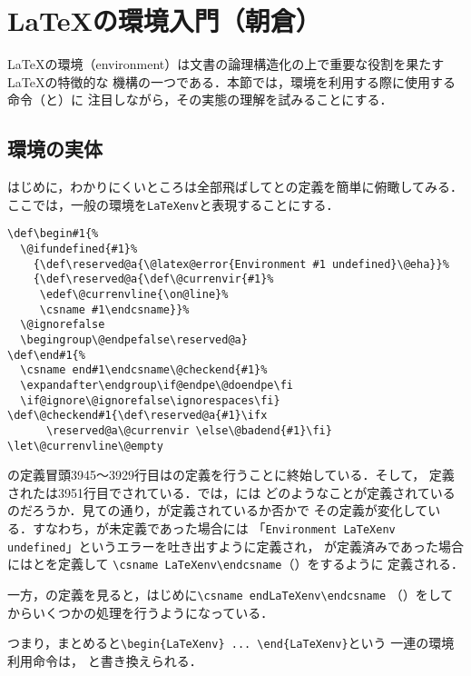 \documentclass[autodetect-engine,dvipdfmx]{jsarticle}
\begin{document}
\section{\LaTeX の環境入門（朝倉）}

\LaTeX の環境（environment）は文書の論理構造化の上で重要な役割を果たす\LaTeX の特徴的な
機構の一つである．本節では，環境を利用する際に使用する命令（と）に
注目しながら，その実態の理解を試みることにする．

\subsection{環境の実体}

はじめに，わかりにくいところは全部飛ばしてとの定義を簡単に俯瞰してみる．
ここでは，一般の環境を\texttt{LaTeXenv}と表現することにする．

\latexltx
\begin{lstlisting}[firstnumber=3944]
\def\begin#1{%
  \@ifundefined{#1}%
    {\def\reserved@a{\@latex@error{Environment #1 undefined}\@eha}}%
    {\def\reserved@a{\def\@currenvir{#1}%
     \edef\@currenvline{\on@line}%
     \csname #1\endcsname}}%
  \@ignorefalse
  \begingroup\@endpefalse\reserved@a}
\def\end#1{%
  \csname end#1\endcsname\@checkend{#1}%
  \expandafter\endgroup\if@endpe\@doendpe\fi
  \if@ignore\@ignorefalse\ignorespaces\fi}
\def\@checkend#1{\def\reserved@a{#1}\ifx
      \reserved@a\@currenvir \else\@badend{#1}\fi}
\let\@currenvline\@empty
\end{lstlisting}

の定義冒頭3945〜3929行目はの定義を行うことに終始している．そして，
定義されたは3951行目でされている．では，には
どのようなことが定義されているのだろうか．見ての通り，が定義されているか否かで
その定義が変化している．すなわち，が未定義であった場合には
「\texttt{Environment LaTeXenv undefined}」というエラーを吐き出すように定義され，
が定義済みであった場合にはとを定義して
\preSub\verb|\csname LaTeXenv\endcsname|（）をするように
定義される．

一方，の定義を見ると，はじめに\preSub\verb|\csname endLaTeXenv\endcsname|
（）をしてからいくつかの処理を行うようになっている．

つまり，まとめると\preSub\verb|\begin{LaTeXenv} ... \end{LaTeXenv}|\preSub という
一連の環境利用命令は，
と書き換えられる．
\end{document}
